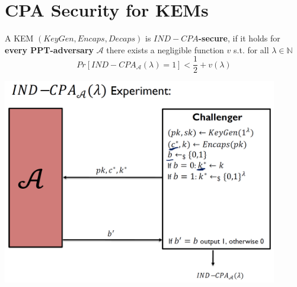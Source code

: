 \section{CPA Security for KEMs}
	\begin{definition}
		A KEM $(KeyGen,Encaps,Decaps)$ is $IND-CPA$\textbf{-secure}, if it holds for \textbf{every PPT-adversary} $\mathcal{A}$ 
		there exists a negligible function $v$ s.t. for all $\lambda \in \mathbb{N}$
		$$Pr[IND-CPA_{\mathcal{A}}(\lambda)=1] < \frac{1}{2} + v(\lambda)$$
	\end{definition}
	\begin{center}
		\includegraphics[width=120mm]{Graphics/Hybrid Encryption/he4.png}
	\end{center}


